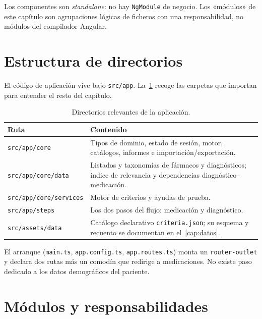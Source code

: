 Los componentes son \textit{standalone}: no hay \texttt{NgModule} de
negocio. Los «módulos» de este capítulo son agrupaciones lógicas de
ficheros con una responsabilidad, no módulos del compilador Angular.

\section{Estructura de directorios}

El código de aplicación vive bajo \texttt{src/app}. La~\cref{tab:arq-directorios}
recoge las carpetas que importan para entender el resto del capítulo.

\begin{table}[H]
  \centering
  \scriptsize
  \begin{tabularx}{\textwidth}{@{}lX@{}}
    \toprule
    \textbf{Ruta} & \textbf{Contenido} \\
    \midrule
    \texttt{src/app/core} &
      Tipos de dominio, estado de sesión, motor, catálogos, informes e
      importación/exportación. \\
    \texttt{src/app/core/data} &
      Listados y taxonomías de fármacos y diagnósticos; índice de
      relevancia y dependencias diagnóstico--medicación. \\
    \texttt{src/app/core/services} &
      Motor de criterios y ayudas de prueba. \\
    \texttt{src/app/steps} &
      Los dos pasos del flujo: medicación y diagnóstico. \\
    \texttt{src/assets/data} &
      Catálogo declarativo \texttt{criteria.json}; su esquema y recuento
      se documentan en el~\cref{cap:datos}. \\
    \bottomrule
  \end{tabularx}
  \caption{Directorios relevantes de la aplicación.}
  \label{tab:arq-directorios}
\end{table}

El arranque (\texttt{main.ts}, \texttt{app.config.ts},
\texttt{app.routes.ts}) monta un \texttt{router-outlet} y declara dos
rutas más un comodín que redirige a medicaciones. No existe paso
dedicado a los datos demográficos del paciente.

\section{Módulos y responsabilidades}

